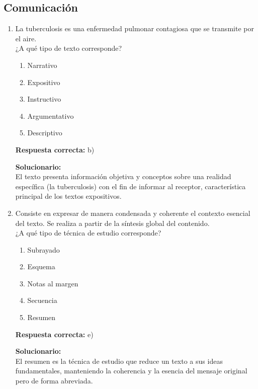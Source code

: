 \subsection*{Comunicación}

\begin{enumerate}
	
	\item La tuberculosis es una enfermedad pulmonar contagiosa que se transmite por el aire. \\ ¿A qué tipo de texto corresponde?
	\begin{enumerate}[label=\alph*)]
		\item Narrativo
		\item Expositivo
		\item Instructivo
		\item Argumentativo
		\item Descriptivo
	\end{enumerate}
	\textbf{Respuesta correcta:} b)
	
	\vspace{2mm}
	\textbf{Solucionario:}\\
	El texto presenta información objetiva y conceptos sobre una realidad específica (la tuberculosis) con el fin de informar al receptor, característica principal de los textos expositivos.
	
	\vspace{6mm}
	
	\item Consiste en expresar de manera condensada y coherente el contexto esencial del texto. Se realiza a partir de la síntesis global del contenido. \\ ¿A qué tipo de técnica de estudio corresponde?
	\begin{enumerate}[label=\alph*)]
		\item Subrayado
		\item Esquema
		\item Notas al margen
		\item Secuencia
		\item Resumen
	\end{enumerate}
	\textbf{Respuesta correcta:} e)
	
	\vspace{2mm}
	\textbf{Solucionario:}\\
	El resumen es la técnica de estudio que reduce un texto a sus ideas fundamentales, manteniendo la coherencia y la esencia del mensaje original pero de forma abreviada.
	
	\vspace{6mm}
	

\end{enumerate}
